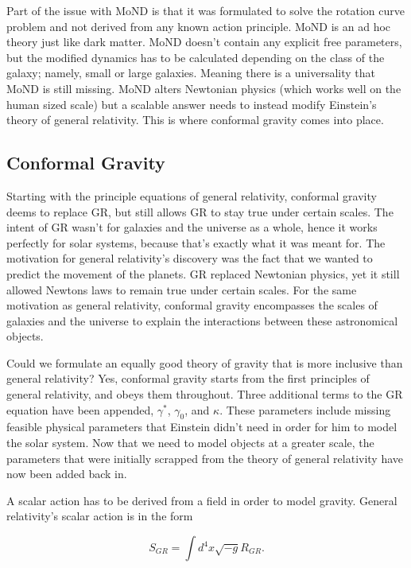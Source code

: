 \documentclass[titlepage]{article}
\begin{document}
Part of the issue with MoND is that it was formulated to solve the rotation curve problem and not derived from any known action principle. MoND is an ad hoc theory just like dark matter. MoND doesn't contain any explicit free parameters, but the modified dynamics has to be calculated depending on the class of the galaxy; namely, small or large galaxies. Meaning there is a universality that MoND is still missing. MoND alters Newtonian physics (which works well on the human sized scale) but a scalable answer needs to instead modify Einstein's theory of general relativity. This is where conformal gravity comes into place.


\subsection{Conformal Gravity}

Starting with the principle equations of general relativity, conformal gravity deems to replace GR, but still allows GR to stay true under certain scales. The intent of GR wasn't for galaxies and the universe as a whole, hence it works perfectly for solar systems, because that's exactly what it was meant for. The motivation for general relativity's discovery was the fact that we wanted to predict the movement of the planets.  GR replaced Newtonian physics, yet it still allowed Newtons laws to remain true under certain scales. For the same motivation as general relativity, conformal gravity encompasses the scales of galaxies and the universe to explain the interactions between these astronomical objects. 

Could we formulate an equally good theory of gravity that is more inclusive than general relativity? Yes, conformal gravity starts from the first principles of general relativity, and obeys them throughout. Three additional terms to the GR equation have been appended, $\gamma^*$, $\gamma_0$, and $\kappa$. These parameters include missing feasible physical parameters that Einstein didn't need in order for him to model the solar system. Now that we need to model objects at a greater scale, the parameters that were initially scrapped from the theory of general relativity have now been added back in.

A scalar action has to be derived from a field in order to model gravity. General relativity's scalar action is in the form 

\begin{equation}
S_{GR} = \int d^4x \sqrt{-g} R_{GR}.
\end{equation}
\end{document}

